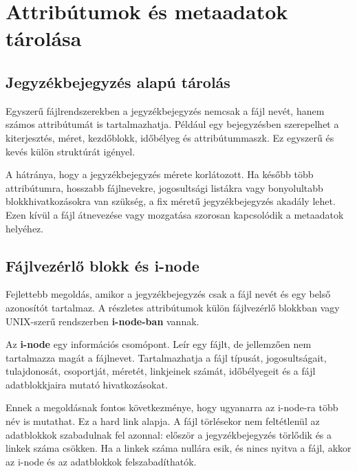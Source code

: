 \begin{center}

\end{center}

\section{Attribútumok és metaadatok tárolása}

\subsection{Jegyzékbejegyzés alapú tárolás}

Egyszerű fájlrendszerekben a jegyzékbejegyzés nemcsak a fájl nevét, hanem számos attribútumát is tartalmazhatja. Például egy bejegyzésben szerepelhet a kiterjesztés, méret, kezdőblokk, időbélyeg és attribútummaszk. Ez egyszerű és kevés külön struktúrát igényel.

A hátránya, hogy a jegyzékbejegyzés mérete korlátozott. Ha később több attribútumra, hosszabb fájlnevekre, jogosultsági listákra vagy bonyolultabb blokkhivatkozásokra van szükség, a fix méretű jegyzékbejegyzés akadály lehet. Ezen kívül a fájl átnevezése vagy mozgatása szorosan kapcsolódik a metaadatok helyéhez.

\subsection{Fájlvezérlő blokk és i-node}

Fejlettebb megoldás, amikor a jegyzékbejegyzés csak a fájl nevét és egy belső azonosítót tartalmaz. A részletes attribútumok külön fájlvezérlő blokkban vagy UNIX-szerű rendszerben \textbf{i-node-ban} vannak.

Az \textbf{i-node} egy információs csomópont. Leír egy fájlt, de jellemzően nem tartalmazza magát a fájlnevet. Tartalmazhatja a fájl típusát, jogosultságait, tulajdonosát, csoportját, méretét, linkjeinek számát, időbélyegeit és a fájl adatblokkjaira mutató hivatkozásokat.



Ennek a megoldásnak fontos következménye, hogy ugyanarra az i-node-ra több név is mutathat. Ez a hard link alapja. A fájl törlésekor nem feltétlenül az adatblokkok szabadulnak fel azonnal: először a jegyzékbejegyzés törlődik és a linkek száma csökken. Ha a linkek száma nullára esik, és nincs nyitva a fájl, akkor az i-node és az adatblokkok felszabadíthatók.

